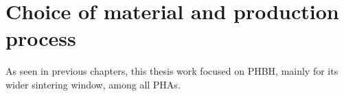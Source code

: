 \documentclass[a4paper]{article}
\begin{document}
%
%
%
%
%



    \clearpage
    \section{Choice of material and production process\label{Choice_material_process}}

    As seen in previous chapters, this thesis work focused on PHBH, mainly for its wider sintering window, among all PHAs. \\ 
\end{document}
